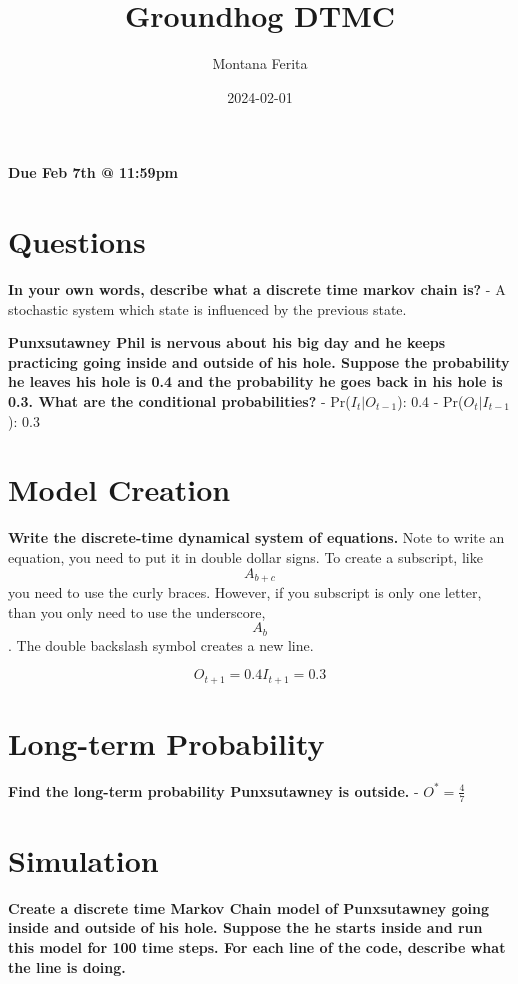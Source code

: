 \documentclass[
]{article}
\title{Groundhog DTMC}
\author{Montana Ferita}
\date{2024-02-01}
\begin{document}
\maketitle

\textbf{Due Feb 7th @ 11:59pm}

\hypertarget{questions}{%
\section{Questions}\label{questions}}

\textbf{In your own words, describe what a discrete time markov chain
is?} - A stochastic system which state is influenced by the previous
state.

\textbf{Punxsutawney Phil is nervous about his big day and he keeps
practicing going inside and outside of his hole. Suppose the probability
he leaves his hole is 0.4 and the probability he goes back in his hole
is 0.3. What are the conditional probabilities?} - Pr(\(I_t|O_{t-1}\)):
0.4 - Pr(\(O_t|I_{t-1}\)): 0.3

\hypertarget{model-creation}{%
\section{Model Creation}\label{model-creation}}

\textbf{Write the discrete-time dynamical system of equations.} Note to
write an equation, you need to put it in double dollar signs. To create
a subscript, like \[A_{b+c}\] you need to use the curly braces. However,
if you subscript is only one letter, than you only need to use the
underscore, \[A_b\]. The double backslash symbol creates a new line.

\[
O_{t+1} = 0.4
I_{t+1} = 0.3 
\]

\hypertarget{long-term-probability}{%
\section{Long-term Probability}\label{long-term-probability}}

\textbf{Find the long-term probability Punxsutawney is outside.} -
\(O^* = \frac{4}{7}\)

\hypertarget{simulation}{%
\section{Simulation}\label{simulation}}

\textbf{Create a discrete time Markov Chain model of Punxsutawney going
inside and outside of his hole. Suppose the he starts inside and run
this model for 100 time steps. For each line of the code, describe what
the line is doing.}
\end{document}

